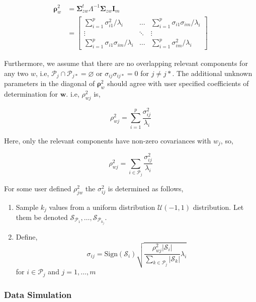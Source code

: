 \documentclass[3p,times,12pt,authoryear]{elsarticle}
\providecommand{\tightlist}{%
  \setlength{\itemsep}{0pt}\setlength{\parskip}{0pt}}
\theoremstyle{definition}
\theoremstyle{definition}
\theoremstyle{remark}
\begin{document}
\[
\begin{aligned}
\boldsymbol{\rho}_w^2 &= \boldsymbol{\Sigma}_{zw}^t \Lambda^{-1} \boldsymbol{\Sigma}_{zw} \mathbf{I}_m \\
&= \begin{bmatrix}
\sum_{i = 1}^p \sigma_{i1}^2/\lambda_i          & \ldots & \sum_{i = 1}^p \sigma_{i1}\sigma_{im}/\lambda_i \\
\vdots                                          & \ddots & \vdots \\
\sum_{i = 1}^p \sigma_{i1}\sigma_{im}/\lambda_i & \ldots & \sum_{i = 1}^p \sigma_{im}^2/\lambda_i
\end{bmatrix}
\end{aligned}
\]

Furthermore, we assume that there are no overlapping relevant components
for any two \(w\), i.e,
\(\mathcal{P}_j \cap \mathcal{P}_{j*} = \varnothing\) or
\(\sigma_{ij}\sigma_{ij*} = 0\) for \(j\ne j*\). The additional unknown
parameters in the diagonal of \(\boldsymbol{\rho}_w^2\) should agree
with user specified coefficients of determination for \(\mathbf{w}\).
i.e, \(\rho_{wj}^2\) is,

\[
\rho_{wj}^2 = \sum_{i = 1}^p\frac{\sigma_{ij}^2}{\lambda_i}
\]

Here, only the relevant components have non-zero covariances with
\(w_j\), so,

\[
\rho_{wj}^2 = \sum_{i \in \mathcal{P}_j}\frac{\sigma_{ij}^2}{\lambda_i}
\]

For some user defined \(\rho_{jw}^2\) the \(\sigma_{ij}^2\) is
determined as follows,

\begin{enumerate}
\def\labelenumi{\arabic{enumi}.}
\tightlist
\item
  Sample \(k_j\) values from a uniform distribution
  \(\mathcal{U}(-1, 1)\) distribution. Let them be denoted
  \(\mathcal{S}_{\mathcal{P}_1}, \ldots, \mathcal{S}_{\mathcal{P}_{k_j}}\).
\item
  Define,
  \[\sigma_{ij} = \text{Sign}\left(\mathcal{S}_i\right)\sqrt{\frac{\rho_{wj}^2\left|\mathcal{S}_i\right|}{\sum_{k\in \mathcal{P}_j}\left|\mathcal{S}_k\right|} \lambda_i}\]
  for \(i \in \mathcal{P}_j\) and \(j = 1, \ldots, m\)
\end{enumerate}

\subsubsection{Data Simulation}\label{data-simulation}
\end{document}
